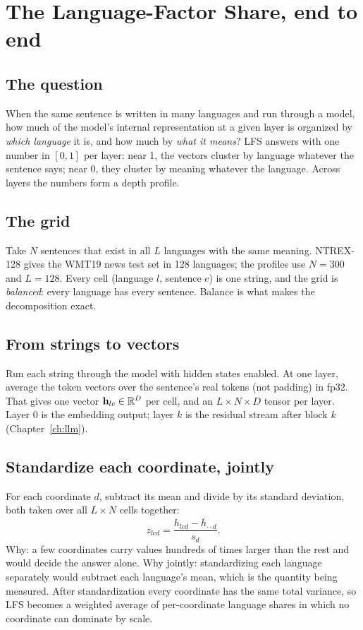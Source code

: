 \section{The Language-Factor Share, end to end}
\label{ch:lfs}

\subsection{The question}

When the same sentence is written in many languages and run through a model,
how much of the model's internal representation at a given layer is organized
by \emph{which language} it is, and how much by \emph{what it means}? LFS
answers with one number in $[0,1]$ per layer: near 1, the vectors cluster by
language whatever the sentence says; near 0, they cluster by meaning whatever
the language. Across layers the numbers form a depth profile.

\subsection{The grid}

Take $N$ sentences that exist in all $L$ languages with the same meaning.
NTREX-128 gives the WMT19 news test set in 128 languages; the profiles use
$N = 300$ and $L = 128$. Every cell (language $l$, sentence $c$) is one
string, and the grid is \emph{balanced}: every language has every sentence.
Balance is what makes the decomposition exact.

\subsection{From strings to vectors}

Run each string through the model with hidden states enabled. At one layer,
average the token vectors over the sentence's real tokens (not padding) in
fp32. That gives one vector $\mathbf h_{lc} \in \mathbb{R}^D$ per cell, and an
$L\times N\times D$ tensor per layer. Layer 0 is the embedding output; layer
$k$ is the residual stream after block $k$ (Chapter~\ref{ch:llm}).

\subsection{Standardize each coordinate, jointly}

For each coordinate $d$, subtract its mean and divide by its standard
deviation, both taken over all $L\times N$ cells together:
\[
z_{lcd} = \frac{h_{lcd} - \overline{h}_{\cdot\cdot d}}{s_d}.
\]
Why: a few coordinates carry values hundreds of times larger than the rest
and would decide the answer alone. Why jointly: standardizing each language
separately would subtract each language's mean, which is the quantity being
measured. After standardization every coordinate has the same total
variance, so LFS becomes a weighted average of per-coordinate language shares
in which no coordinate can dominate by scale.

